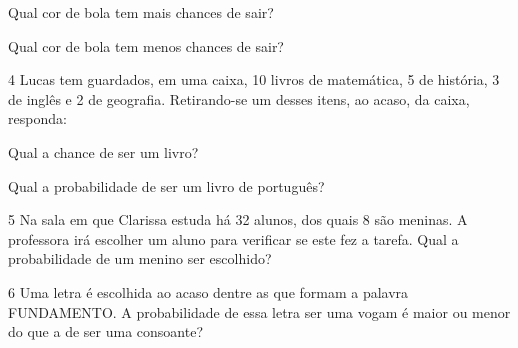 \begin{escolha}
\item Qual cor de bola tem mais chances de sair?


\item  Qual cor de bola tem menos chances de sair?

\end{escolha}


\num{4} Lucas tem guardados, em uma caixa, 10 livros de matemática, 5 de história, 3 de inglês e
2 de geografia. Retirando-se um desses itens, ao acaso, da caixa,
responda:

\begin{escolha}
\item Qual a chance de ser um livro?


\item  Qual a probabilidade de ser um livro de português?

\end{escolha}

\num{5} Na sala em que Clarissa estuda há 32 alunos, dos quais 8 são meninas. A
professora irá escolher um aluno para verificar se este fez a tarefa.
Qual a probabilidade de um menino ser escolhido?





\num{6} Uma letra é escolhida ao acaso dentre as que formam a palavra
FUNDAMENTO. A probabilidade de essa letra ser uma vogam é maior ou menor do que a de ser uma consoante?





